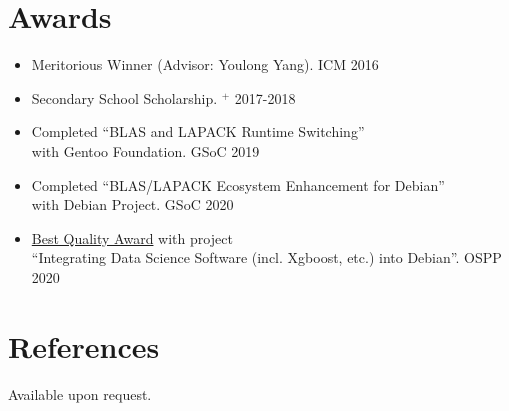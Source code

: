 \documentclass[margin,line,pifont,palatino,courier]{res}
\begin{document}
\begin{resume}
%
%
%

\section{\sc Awards}

\begin{itemize}[leftmargin=*]
	\item Meritorious Winner (Advisor: Youlong Yang). \hfill ICM 2016
	\item Secondary School Scholarship. \href{http://see.xidian.edu.cn/html/news/9732.html}{$^+$} \hfill 2017-2018
	\item Completed ``BLAS and LAPACK Runtime Switching''\\ with Gentoo Foundation. \hfill GSoC 2019
	\item Completed ``BLAS/LAPACK Ecosystem Enhancement for Debian''\\ with Debian Project. \hfill GSoC 2020
	\item \href{https://isrc.iscas.ac.cn/summer2020/#/announcement}{Best Quality Award}
		with project\\ ``Integrating Data Science Software (incl. Xgboost, etc.) into Debian''.
		\hfill OSPP 2020
\end{itemize}


%

\section{\sc References}
{\sc Available upon request.}

%


\end{resume}
\end{document}
